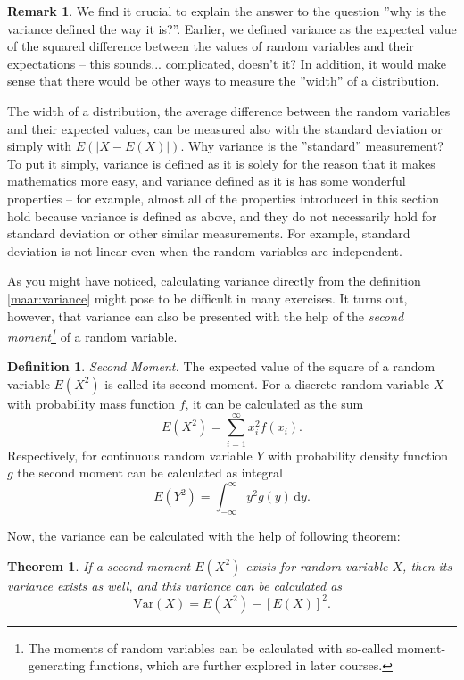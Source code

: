 \documentclass[12pt,a4paper,leqno]{report}
\newcommand{\dif}{\,\mathrm{d}}
\newcommand{\var}{\mathrm{Var}}
\theoremstyle{plain}
\newtheorem{lause}[equation]{Theorem}
\theoremstyle{definition}
\newtheorem{maar}[equation]{Definition}
\newtheorem{remark}[equation]{Remark}
\begin{document}
\begin{remark}
We find it crucial to explain the answer to the question ''why is the variance defined the way it is?''. Earlier, we defined variance as the expected value of the squared difference between the values of random variables and their expectations -- this sounds... complicated, doesn't it? In addition, it would make sense that there would be other ways to measure the ''width'' of a distribution.

The width of a distribution, the average difference between the random variables and their expected values, can be measured also with the standard deviation or simply with $E(|X-E(X)|)$. Why variance is the ''standard'' measurement? To put it simply, variance is defined as it is solely for the reason that it makes mathematics more easy, and variance defined as it is has some wonderful properties -- for example, almost all of the properties introduced in this section hold because variance is defined as above, and they do not necessarily hold for standard deviation or other similar measurements. For example, standard deviation is not linear even when the random variables are independent.
\end{remark}

As you might have noticed, calculating variance directly from the definition \ref{maar:variance} might pose to be difficult in many exercises. It turns out, however, that variance can also be presented with the help of the \emph{second moment\footnote{The moments of random variables can be calculated with so-called moment-generating functions, which are further explored in later courses.}} of a random variable.

\begin{maar}
\emph{Second Moment.} The expected value of the square of a random variable $E(X^2)$ is called its second moment. For a discrete random variable $X$ with probability mass function $f$, it can be calculated as the sum
\[
E(X^2) = \sum_{i=1}^\infty x_i^2f(x_i).
\]
Respectively, for continuous random variable $Y$ with probability density function $g$ the second moment can be calculated as integral
\[
E(Y^2) = \int_{-\infty}^\infty y^2 g(y) \dif y.
\]
\end{maar}

Now, the variance can be calculated with the help of following theorem:

\begin{lause}
\label{lause:variance}
If a second moment $E(X^2)$ exists for random variable $X$, then its variance exists as well, and this variance can be calculated as 
\[
\var(X) = E(X^2) - [E(X)]^2.
\]
\end{lause}
\end{document}
